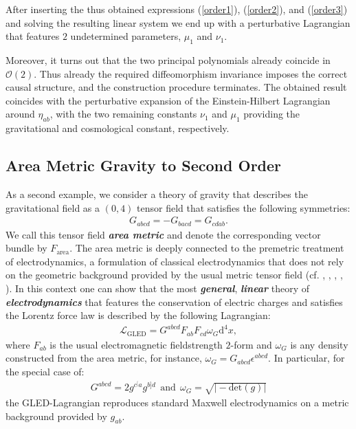 \documentclass[%
 reprint,
nofootinbib,
 amsmath,amssymb,
 aps,
 prd,
floatfix,
]{revtex4-2}
\begin{document}
After inserting the thus obtained expressions (\ref{order1}), (\ref{order2}), and (\ref{order3}) and solving the resulting linear system we end up with a perturbative Lagrangian that features $2$ undetermined parameters, $\mu_1$ and $\nu_1$. 

Moreover, it turns out that the two principal polynomials already coincide in $\mathcal{O}(2)$. 
Thus already the required diffeomorphism invariance imposes the correct causal structure, and the construction procedure terminates. 
The obtained result coincides with the perturbative expansion of the Einstein-Hilbert Lagrangian around $\eta_{ab}$, with the two remaining constants $\nu_1$ and $\mu_1$ providing the gravitational and cosmological constant, respectively.
\subsection{Area Metric Gravity to Second Order}
As a second example, we consider a theory of gravity that describes the gravitational field as a $(0,4)$ tensor field that satisfies the following symmetries:
\begin{align}\label{areaSym}
    G_{abcd} = -G_{bacd} = G_{cdab}.
\end{align}
We call this tensor field \textit{\textbf{area metric}} and denote the corresponding vector bundle by $F_{\text{area}}$. 
The area metric is deeply connected to the premetric treatment of electrodynamics, a formulation of classical electrodynamics that does not rely on the geometric background provided by the usual metric tensor field (cf. \cite{hehl2003foundations}, \cite{Hehl2005}, \cite{2004PhRvD..70j5022L}, \cite{1999PhLB..458..466O}, \cite{2009JPhA...42U5402I}).
In this context one can show that the most \textit{\textbf{general}}, \textit{\textbf{linear}} theory of \textit{\textbf{electrodynamics}} that features the conservation of electric charges and satisfies the Lorentz force law is described by the following Lagrangian:
\begin{align}
    \mathcal{L}_{\text{GLED}} =  G^{abcd}F_{ab}F_{cd}\omega_G\mathrm{d}^4x,
\end{align}
where $F_{ab}$ is the usual electromagnetic fieldstrength $2$-form and $\omega_G$ is any density constructed from the area metric, for instance, $\omega_G = G_{abcd}\epsilon^{abcd}$. 
In particular, for the special case of:
\begin{align}
    G^{abcd} = 2 g^{c^[a}g^{b]d} \ \ \text{and} \ \  \omega_{G}=\sqrt{\vert -\mathrm{det}(g) \vert}
\end{align}
the GLED-Lagrangian reproduces standard Maxwell electrodynamics on a metric background provided by $g_{ab}$.
\end{document}

